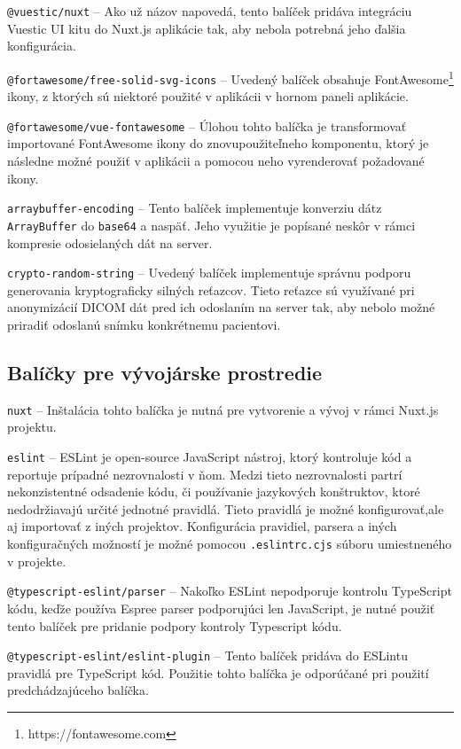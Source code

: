 \texttt{@vuestic/nuxt} -- Ako už názov napovedá, tento balíček pridáva integráciu Vuestic UI kitu do Nuxt.js aplikácie tak, aby nebola potrebná jeho ďalšia konfigurácia.

\texttt{@fortawesome/free-solid-svg-icons} -- Uvedený balíček obsahuje FontAwesome\footnote{https://fontawesome.com} ikony, z ktorých sú niektoré použité v aplikácii v hornom paneli aplikácie.

\clearpage

\texttt{@fortawesome/vue-fontawesome} -- Úlohou tohto balíčka je transformovať importované FontAwesome ikony do znovupoužiteľneho komponentu, ktorý je následne možné použiť v aplikácii a pomocou neho vyrenderovať požadované ikony.

\texttt{arraybuffer-encoding} -- Tento balíček implementuje konverziu dát\newline z \texttt{ArrayBuffer} do \texttt{base64} a naspäť. Jeho využitie je popísané neskôr v rámci kompresie odosielaných dát na server.

\texttt{crypto-random-string} -- Uvedený balíček implementuje správnu podporu generovania kryptograficky silných reťazcov. Tieto reťazce sú využívané pri anonymizácií DICOM dát pred ich odoslaním na server tak, aby nebolo možné priradiť odoslanú snímku konkrétnemu pacientovi.

\subsection {Balíčky pre vývojárske prostredie}
\texttt{nuxt} -- Inštalácia tohto balíčka je nutná pre vytvorenie a vývoj v rámci Nuxt.js projektu.

\texttt{eslint} -- ESLint je open-source JavaScript nástroj, ktorý kontroluje kód a reportuje prípadné nezrovnalosti v ňom. Medzi tieto nezrovnalosti partrí nekonzistentné odsadenie kódu, či používanie jazykových konštruktov, ktoré nedodržiavajú určité jednotné pravidlá. Tieto pravidlá je možné konfigurovať,\newline ale aj importovať z iných projektov. Konfigurácia pravidiel, parsera a iných konfiguračných možností je možné pomocou \texttt{.eslintrc.cjs} súboru umiestneného v projekte.

\texttt{@typescript-eslint/parser} -- Nakoľko ESLint nepodporuje kontrolu TypeScript kódu, keďže používa Espree parser podporujúci len JavaScript, je nutné použiť tento balíček pre pridanie podpory kontroly Typescript kódu. 

\texttt{@typescript-eslint/eslint-plugin} -- Tento balíček pridáva do ESLintu pravidlá pre TypeScript kód. Použitie tohto balíčka je odporúčané pri použití predchádzajúceho balíčka.


